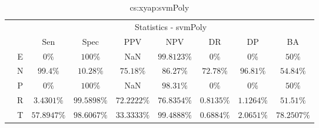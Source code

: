 \begin{table}[!ht]
	\centering
	\begin{tabular}{|c|c|c|c|c|c|c|c|c|}
		\cline{3-9}
		\multicolumn{2}{c|}{} & \multicolumn{7}{c|}{Statistics - svmPoly} \\ \cline{3-9}
		\multicolumn{2}{c|}{} & Sen & Spec & PPV & NPV & DR & DP & BA \\ \hline
		\multirow{5}{*}{\rotatebox{90}{Class}} & E & $0\%$ & $100\%$ & NaN & $99.8123\%$ & $0\%$ & $0\%$ & $50\%$ \\ \cline{2-9}
		 & N & $99.4\%$ & $10.28\%$ & $75.18\%$ & $86.27\%$ & $72.78\%$ & $96.81\%$ & $54.84\%$ \\ \cline{2-9}
		 & P & $0\%$ & $100\%$ & NaN & $98.31\%$ & $0\%$ & $0\%$ & $50\%$ \\ \cline{2-9}
		 & R & $3.4301\%$ & $99.5898\%$ & $72.2222\%$ & $76.8354\%$ & $0.8135\%$ & $1.1264\%$ & $51.51\%$ \\ \cline{2-9}
		 & T & $57.8947\%$ & $98.6067\%$ & $33.3333\%$ & $99.4888\%$ & $0.6884\%$ & $2.0651\%$ & $78.2507\%$ \\ \hline
	\end{tabular}
	\caption{cs:xyap:svmPoly}
	\label{tab:cs:xyap:svmPoly}
\end{table}
